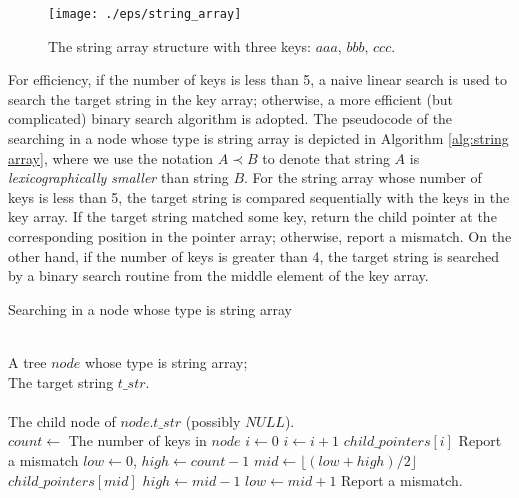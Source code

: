\begin{figure}[htbp]
  \centering
  \texttt{[image: ./eps/string\_array]}
  \caption{The string array structure with three keys: $aaa,\, bbb,\,
    ccc$.}
  \label{fig:string array}
\end{figure}

For efficiency, if the number of keys is less than 5, a naive linear
search is used to search the target string in the key array;
otherwise, a more efficient (but complicated) binary search algorithm
is adopted.  The pseudocode of the searching in a node whose type is
string array is depicted in Algorithm \ref{alg:string array}, where we
use the notation $A \prec B$ to denote that string $A$ is
\emph{lexicographically smaller} than string $B$. For the string array
whose number of keys is less than 5, the target string is compared
sequentially with the keys in the key array. If the target string
matched some key, return the child pointer at the corresponding
position in the pointer array; otherwise, report a mismatch. On the
other hand, if the number of keys is greater than 4, the target string
is searched by a binary search routine from the middle element of the
key array.

\begin{algorithm}
  \caption{Searching in a node whose type is string array}\scriptsize
  \label{alg:string array}
  \begin{algorithmic}[1]
    \REQUIRE ~~\\
    A tree $node$ whose type is string array; \\
    The target string $t\_str$.\\
    \ENSURE ~~\\
    The child node of $node.t\_str$ (possibly $NULL$).\\
    \STATE
    \STATE $count \leftarrow$ The number of keys in $node$
    \STATE
    \STATE $i \leftarrow 0$
    \STATE $i \leftarrow i+1$
    \ENDWHILE
    \RETURN $child\_pointers[i]$
    \ELSE
    \STATE Report a mismatch
    \ENDIF
    \ELSE
    \STATE $low \leftarrow 0$, $high \leftarrow count-1$
    \STATE $mid \leftarrow \lfloor (low+high)/2 \rfloor$
    \RETURN $child\_pointers[mid]$
    \STATE $high \leftarrow mid - 1$
    \ELSE
    \STATE $low \leftarrow mid + 1$
    \ENDIF
    \ENDWHILE
    \STATE Report a mismatch.
    \ENDIF
  \end{algorithmic}
\end{algorithm}

